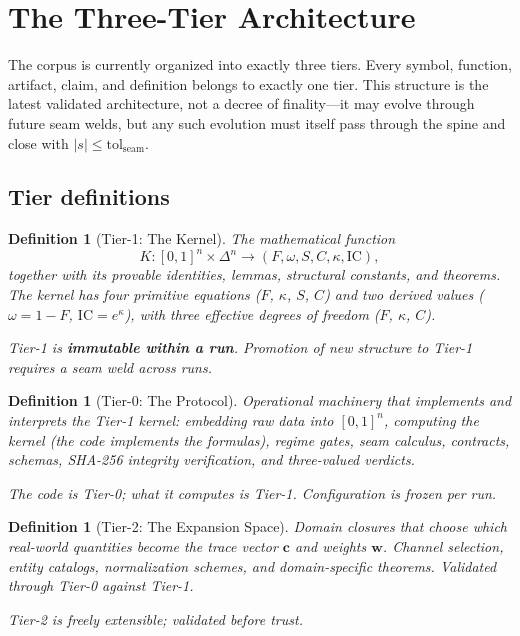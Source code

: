 \documentclass[
  aps,
  prd,
  twocolumn,
  superscriptaddress,
  nofootinbib,
  floatfix
]{revtex4-2}
\newtheorem{definition}[theorem]{Definition}
\newcommand{\tolseam}{\mathrm{tol}_{\mathrm{seam}}}
\newcommand{\beq}{\begin{equation}}
\newcommand{\eeq}{\end{equation}}
\newcommand{\tvec}{\mathbf{c}}
\newcommand{\wvec}{\mathbf{w}}
\newcommand{\IC}{\mathrm{IC}}
\begin{document}
\section{The Three-Tier Architecture}\label{sec:tiers}

The corpus is currently organized into exactly three tiers.
Every symbol, function, artifact, claim, and definition belongs
to exactly one tier.  This structure is the latest validated
architecture, not a decree of finality---it may evolve through
future seam welds, but any such evolution must itself pass
through the spine and close with $|s| \leq \tolseam$.

\subsection{Tier definitions}

\begin{definition}[Tier-1: The Kernel]
\label{def:tier1}
The mathematical function
\beq
  K: [0,1]^n \times \Delta^n \to (F, \omega, S, C, \kappa, \IC),
\eeq
together with its provable identities, lemmas, structural constants,
and theorems.  The kernel has four primitive equations ($F$, $\kappa$,
$S$, $C$) and two derived values ($\omega = 1 - F$, $\IC = e^\kappa$),
with three effective degrees of freedom ($F$, $\kappa$, $C$).

Tier-1 is \textbf{immutable within a run}.  Promotion of new
structure to Tier-1 requires a seam weld across runs.
\end{definition}

\begin{definition}[Tier-0: The Protocol]
\label{def:tier0}
Operational machinery that \emph{implements and interprets} the
Tier-1 kernel: embedding raw data into $[0,1]^n$, computing the
kernel (the code implements the formulas), regime gates, seam
calculus, contracts, schemas, SHA-256 integrity verification,
and three-valued verdicts.

The code is Tier-0; \emph{what it computes} is Tier-1.
Configuration is frozen per run.
\end{definition}

\begin{definition}[Tier-2: The Expansion Space]
\label{def:tier2}
Domain closures that choose which real-world quantities become the
trace vector $\tvec$ and weights $\wvec$.  Channel selection, entity
catalogs, normalization schemes, and domain-specific theorems.
Validated through Tier-0 against Tier-1.

Tier-2 is freely extensible; validated before trust.
\end{definition}
\end{document}
